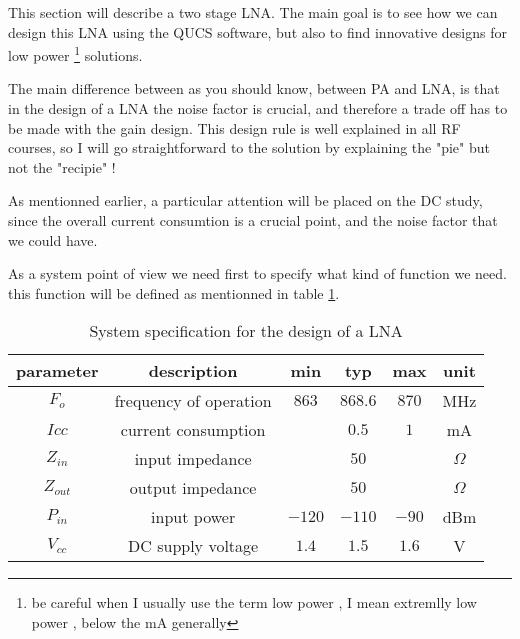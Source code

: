 %
%
%
%

This section will describe a two stage LNA. The main goal is to see how we can design this LNA using the QUCS software, but also to find innovative designs for low power \footnote{be careful when I usually use the term low power , I mean extremlly low power , below the mA generally} solutions.

\bigskip

The main difference between as you should know, between PA and LNA, is that in the design of a LNA the noise factor is crucial, and therefore a trade off has to be made with the gain design. This design rule is well explained in all RF courses, so I will go straightforward to the solution by explaining the "pie" but not the "recipie" !

\bigskip 

As mentionned earlier, a particular attention will be placed on the DC study, since the overall current consumtion is a crucial point, and the noise factor that we could have.


As a system point of view we need first to specify what kind of function we need. this function will be defined as mentionned in table \ref{design:lna:systemSpecification}.


\begin{table}[htp]
\caption{System specification for the design of a LNA}
\begin{center}
\begin{tabular}{|c|c|c|c|c|c|} \hline
parameter & description 					& min   & typ     & max   & unit \\ \hline \hline
$F_o$     & frequency of operation		& $863$ & $868.6$ & $870$ & MHz \\
$Icc$ 	   & current consumption        &       &    $0.5$     & $1$    & mA \\ \hline
$Z_{in}$  & input impedance            &       & $50$    &        & $\Omega$ \\
$Z_{out}$  & output impedance            &       & $50$    &        & $\Omega$ \\ \hline
$P_{in}$   & input power                &   $-120$ & $-110$ & $-90$ & dBm \\
$V_{cc}$   & DC supply voltage                &   $1.4$ & $1.5$ & $1.6$ & V \\ \hline
\end{tabular}
\end{center}
\label{design:lna:systemSpecification}
\end{table}

